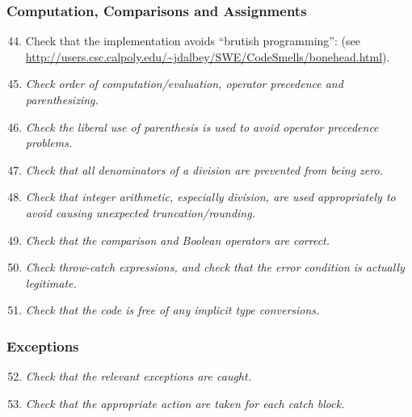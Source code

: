 	\subsubsection{Computation, Comparisons and Assignments}
		\begin{enumerate}
			\setcounter{enumi}{43}
			\item \begin{itshape}
				Check that the implementation avoids “brutish programming”: (see \url{http://users.csc.calpoly.edu/~jdalbey/SWE/CodeSmells/bonehead.html}).
				\end{itshape}

			\item \textit{Check order of computation/evaluation, operator precedence and parenthesizing.}\newline

			\item \textit{Check the liberal use of parenthesis is used to avoid operator precedence problems.}\newline

			\item \textit{Check that all denominators of a division are prevented from being zero.}\newline

			\item \textit{Check that integer arithmetic, especially division, are used appropriately to avoid causing unexpected truncation/rounding.}\newline

			\item \textit{Check that the comparison and Boolean operators are correct.}\newline

			\item \textit{Check throw-catch expressions, and check that the error condition is actually legitimate.}

			\item \textit{Check that the code is free of any implicit type conversions.}\newline

		\end{enumerate}

	\subsubsection{Exceptions}
		\begin{enumerate}
			\setcounter{enumi}{51}
			\item \textit{Check that the relevant exceptions are caught.}\newline

			\item \textit{Check that the appropriate action are taken for each catch block.}

		\end{enumerate}

